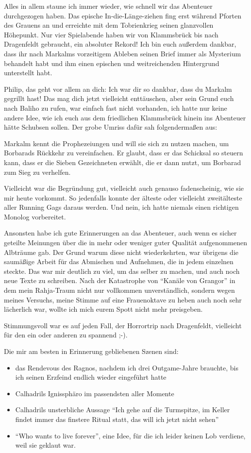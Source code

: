 Alles in allem staune ich immer wieder, wie schnell wir das Abenteuer durchgezogen haben. Das epische In-die-Länge-ziehen fing erst während Pforten des Grauens an und erreichte mit dem Tobrienkrieg seinen glanzvollen Höhepunkt. Nur vier Spielabende haben wir von Klammsbrück bis nach Dragenfeldt gebraucht, ein absoluter Rekord!
Ich bin euch außerdem dankbar, dass ihr nach Markalms vorzeitigem Ableben seinen Brief immer als Mysterium behandelt habt und ihm einen epischen und weitreichenden Hintergrund unterstellt habt.

Philip, das geht vor allem an dich: Ich war dir so dankbar, dass du Markalm gegrillt hast! Das mag dich jetzt vielleicht enttäuschen, aber sein Grund euch nach Baliho zu rufen, war einfach fast nicht vorhanden, ich hatte nur keine andere Idee, wie ich euch aus dem friedlichen Klammsbrück hinein ins Abenteuer hätte Schubsen sollen. Der grobe Umriss dafür sah folgendermaßen aus:

Markalm kennt die Prophezeiungen und will sie sich zu nutzen machen, um Borbarads Rückkehr zu vereinfachen. Er glaubt, dass er das Schicksal so steuern kann, dass er die Sieben Gezeichneten erwählt, die er dann nutzt, um Borbarad zum Sieg zu verhelfen.

Vielleicht war die Begründung gut, vielleicht auch genauso fadenscheinig, wie sie mir heute vorkommt. So jedenfalls konnte der älteste oder vielleicht zweitälteste aller Running Gags daraus werden. Und nein, ich hatte niemals einen richtigen Monolog vorbereitet.

Ansonsten habe ich gute Erinnerungen an das Abenteuer, auch wenn es sicher geteilte Meinungen über die in mehr oder weniger guter Qualität aufgenommenen Albträume gab. Der Grund warum diese nicht wiederkehrten, war übrigens die saumäßige Arbeit für das Abmischen und Aufnehmen, die in jedem einzelnen steckte. Das war mir deutlich zu viel, um das selber zu machen, und auch noch neue Texte zu schreiben. Nach der Katastrophe von ``Kanäle von Grangor'' in dem mein Rahja-Traum nicht nur vollkommen unverständlich, sondern wegen meines Versuchs, meine Stimme auf eine Frauenoktave zu heben auch noch sehr lächerlich war, wollte ich mich eurem Spott nicht mehr preisgeben.

Stimmungsvoll war es auf jeden Fall, der Horrortrip nach Dragenfeldt, vielleicht für den ein oder anderen zu spannend ;-).


Die mir am besten in Erinnerung gebliebenen Szenen sind:
\begin{itemize}
\item das Rendevous des Ragnos, nachdem ich drei Outgame-Jahre brauchte, bis ich seinen Erzfeind endlich wieder eingeführt hatte
\item Calhadrils Ignissphäro im passendsten aller Momente
\item Calhadrils unsterbliche Aussage ``Ich gehe auf die Turmspitze, im Keller findet immer das finstere Ritual statt, das will ich jetzt nicht sehen''
\item ``Who wants to live forever'', eine Idee, für die ich leider keinen Lob verdiene, weil sie geklaut war.
\end{itemize}


